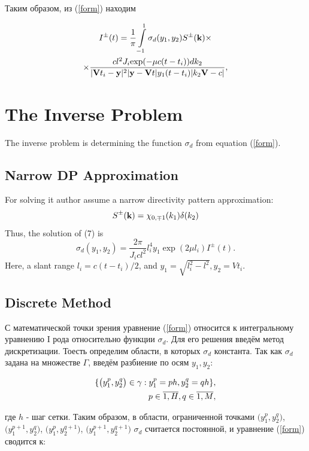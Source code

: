 \documentclass{procDDs}
\begin{document}
Таким образом, из (\ref{form}) находим

\begin{multline}
	I^\pm(t) = \frac{1}{\pi}\int\limits_{-1}^{1}\sigma_d(y_1,y_2) S^{\pm}(\mathbf{k}) \times \\ \times
	\frac{ cl^2J_i \text{exp}(-\mu c(t-t_i))dk_2}{|\mathbf{V}t_i-\mathbf{y}|^2|\mathbf{y}-\mathbf{V}t|y_1(t-t_i)|k_2 \mathbf{V}-c|},
\end{multline}


\section{The Inverse Problem}
The inverse problem is determining the function $\sigma_d$ from equation (\ref{form}).

\subsection{Narrow DP Approximation}

 For solving it author assume a narrow directivity pattern approximation:
\begin{equation}
S^{\pm}(\mathbf{k}) = \chi_{0,\mp1}(k_1)\delta(k_2)
\end{equation}
Thus, the solution of (7) is
\begin{equation}
	\label{sigma_form}
	\sigma_d \left( y_1, y_2 \right) = \frac{2\pi}{J_icl^2} l_i^4 y_1 \exp(2\mu l_i)I^\pm(t).
\end{equation}
Here, a slant range $l_i=c(t-t_i)/2$, and $y_1=\sqrt{l_i^2-l^2}, y_2=Vt_i$.

\subsection{Discrete Method}
С математической точки зрения уравнение (\ref{form}) относится к интегральному уравнению I рода относительно функции $\sigma_d$. Для его решения введём метод дискретизации. Тоесть определим области, в которых $\sigma_d$  константа. Так как $\sigma_d$ задана на множестве $\Gamma$, введём разбиение по осям $y_1, y_2$:

\begin{align}
	\{ \big( y_1^p, y_2^q \big) \in\gamma: y_1^p = ph, y_2^q = qh \}, \notag \\ 
	p \in \overline{1, H}, q \in \overline{1, M}, 
\end{align}

где $h$ - шаг сетки. Таким образом, в области, ограниченной точками $\big(y_1^p, y_2^q\big)$, $\big(y_1^{p+1}, y_2^q\big)$, $\big(y_1^p, y_2^{q+1}\big)$, $\big(y_1^{p+1}, y_2^{q+1}\big)$ $\sigma_d$ считается постоянной, и уравнение (\ref{form}) сводится к:
\end{document}
